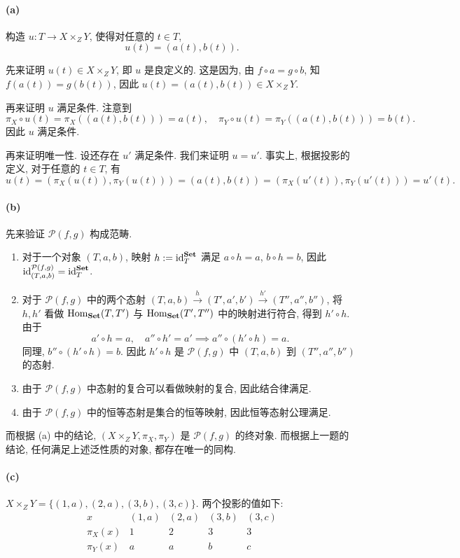 \documentclass{article}
\begin{document}
\begin{solution}
	\paragraph{(a)} 构造 $u: T \to X \times_Z Y$, 使得对任意的 $t \in T$, 
	\[ u(t) = (a(t), b(t)). \]
	
	先来证明 $u(t) \in X \times_Z Y$, 即 $u$ 是良定义的. 这是因为, 由 $f \circ a = g \circ b$, 知 $f(a(t)) = g(b(t))$, 因此 $u(t) = (a(t), b(t)) \in X \times_Z Y$. 

	再来证明 $u$ 满足条件. 注意到
	\[ \pi_X \circ u(t) = \pi_X((a(t),b(t))) = a(t), \quad
	\pi_Y \circ u(t) = \pi_Y((a(t),b(t))) = b(t). \]
	因此 $u$ 满足条件.

	再来证明唯一性. 设还存在 $u'$ 满足条件. 我们来证明 $u = u'$. 事实上, 根据投影的定义, 对于任意的 $t \in T$, 有
	\[ u(t) = (\pi_X(u(t)), \pi_Y(u(t))) = (a(t), b(t))
	 = (\pi_X(u'(t)), \pi_Y(u'(t))) = u'(t). \]

	\paragraph{(b)} 先来验证 $\mathcal{P}(f,g)$ 构成范畴. 
	\begin{enumerate}[label=(\arabic*)]
		\item 对于一个对象 $(T,a,b)$, 映射 $h := \operatorname{id}_T^{\mathbf{Set}}$ 满足 $a \circ h = a$, $b \circ h = b$, 因此 $\operatorname{id}_{(T,a,b)}^{\mathcal{P}(f,g)} = \operatorname{id}_T^{\mathbf{Set}}$. 
		\item 对于 $\mathcal{P}(f,g)$ 中的两个态射 $(T,a,b) \xrightarrow{h} (T',a',b') \xrightarrow{h'} (T'',a'',b'')$, 将 $h,h'$ 看做 $\operatorname{Hom}_{\mathbf{Set}}(T,T')$ 与 $\operatorname{Hom}_{\mathbf{Set}}(T',T'')$ 中的映射进行符合, 得到 $h' \circ h$. 由于
		\[ a' \circ h = a, \quad a'' \circ h' = a' \implies a'' \circ (h' \circ h) = a. \]
		同理, $b'' \circ (h' \circ h) = b$. 因此 $h' \circ h$ 是 $\mathcal{P}(f,g)$ 中 $(T,a,b)$ 到 $(T'',a'',b'')$ 的态射.
		\item 由于 $\mathcal{P}(f,g)$ 中态射的复合可以看做映射的复合, 因此结合律满足.
		\item 由于 $\mathcal{P}(f,g)$ 中的恒等态射是集合的恒等映射, 因此恒等态射公理满足.
	\end{enumerate}

	而根据 (a) 中的结论, $(X \times_Z Y, \pi_X, \pi_Y)$ 是 $\mathcal{P}(f,g)$ 的终对象. 而根据上一题的结论, 任何满足上述泛性质的对象, 都存在唯一的同构.

	\paragraph{(c)} $X \times_Z Y = \{(1,a), (2,a), (3,b), (3,c)\}$. 两个投影的值如下: 
	\[ \begin{array}{c|cccc}
		x & (1,a) & (2,a) & (3,b) & (3,c) \\ \hline 
		\pi_X(x) & 1 & 2 & 3 & 3 \\
		\pi_Y(x) & a & a & b & c
	\end{array} \]


\end{solution}
\end{document}
